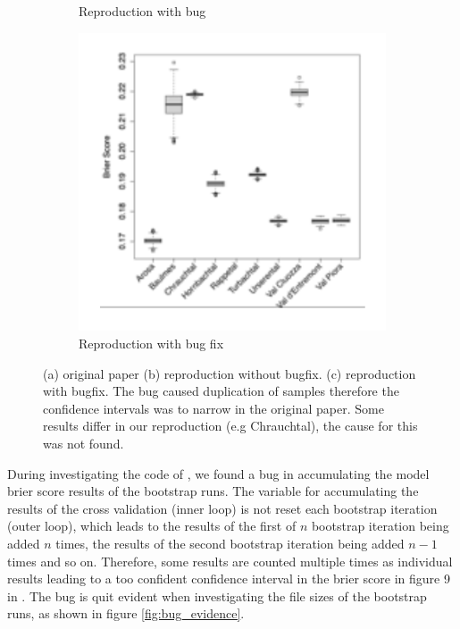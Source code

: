\documentclass[twoside,twocolumn]{article}
\begin{document}
\begin{figure}
\begin{subfigure}{.33\textwidth}
      \caption{Reproduction with bug}
      \label{fig:bug_fix:2}
    \end{subfigure}%
    \begin{subfigure}{.33\textwidth}
      \centering
      \includegraphics[width=\linewidth]{repr_brierscore}
      \caption{Reproduction with bug fix}
      \label{fig:bug_fix:3}
    \end{subfigure}
    \caption{(a) original paper (b) reproduction without bugfix. (c) reproduction with bugfix. \newline The bug caused duplication of samples therefore the confidence intervals was to narrow in the original paper. Some results differ in our reproduction (e.g Chrauchtal), the cause for this was not found. }
    \label{fig:bug_fix}
\end{figure}

During investigating the code of \cite{zweifel_samarin_meusburger_alewell_2021}, we found a bug in accumulating the model brier score results of the bootstrap runs.
The variable for accumulating the results of the cross validation (inner loop) is not reset each bootstrap iteration (outer loop), which leads to the results of the first of $n$ bootstrap iteration being added $n$ times, the results of the second bootstrap iteration being added $n-1$ times and so on.
Therefore, some results are counted multiple times as individual results leading to a too confident confidence interval in the brier score in figure 9 in \cite{zweifel_samarin_meusburger_alewell_2021}.
The bug is quit evident when investigating the file sizes of the bootstrap runs, as shown in figure \ref{fig:bug_evidence}.
\end{document}
